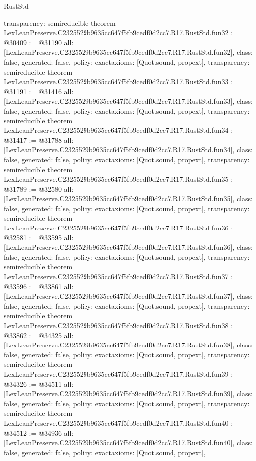 \begin{lexlean}{RustStd}
\begin{coremodule}
{  transparency: semireducible
}
theorem LexLeanPreserve.C2325529b9635cc647f5fb9cedf0d2cc7.R17.RustStd.fun32 : @30409 := @31190 {
  all: [LexLeanPreserve.C2325529b9635cc647f5fb9cedf0d2cc7.R17.RustStd.fun32],
  class: false,
  generated: false,
  policy: exact{axioms: [Quot.sound, propext]},
  transparency: semireducible
}
theorem LexLeanPreserve.C2325529b9635cc647f5fb9cedf0d2cc7.R17.RustStd.fun33 : @31191 := @31416 {
  all: [LexLeanPreserve.C2325529b9635cc647f5fb9cedf0d2cc7.R17.RustStd.fun33],
  class: false,
  generated: false,
  policy: exact{axioms: [Quot.sound, propext]},
  transparency: semireducible
}
theorem LexLeanPreserve.C2325529b9635cc647f5fb9cedf0d2cc7.R17.RustStd.fun34 : @31417 := @31788 {
  all: [LexLeanPreserve.C2325529b9635cc647f5fb9cedf0d2cc7.R17.RustStd.fun34],
  class: false,
  generated: false,
  policy: exact{axioms: [Quot.sound, propext]},
  transparency: semireducible
}
theorem LexLeanPreserve.C2325529b9635cc647f5fb9cedf0d2cc7.R17.RustStd.fun35 : @31789 := @32580 {
  all: [LexLeanPreserve.C2325529b9635cc647f5fb9cedf0d2cc7.R17.RustStd.fun35],
  class: false,
  generated: false,
  policy: exact{axioms: [Quot.sound, propext]},
  transparency: semireducible
}
theorem LexLeanPreserve.C2325529b9635cc647f5fb9cedf0d2cc7.R17.RustStd.fun36 : @32581 := @33595 {
  all: [LexLeanPreserve.C2325529b9635cc647f5fb9cedf0d2cc7.R17.RustStd.fun36],
  class: false,
  generated: false,
  policy: exact{axioms: [Quot.sound, propext]},
  transparency: semireducible
}
theorem LexLeanPreserve.C2325529b9635cc647f5fb9cedf0d2cc7.R17.RustStd.fun37 : @33596 := @33861 {
  all: [LexLeanPreserve.C2325529b9635cc647f5fb9cedf0d2cc7.R17.RustStd.fun37],
  class: false,
  generated: false,
  policy: exact{axioms: [Quot.sound, propext]},
  transparency: semireducible
}
theorem LexLeanPreserve.C2325529b9635cc647f5fb9cedf0d2cc7.R17.RustStd.fun38 : @33862 := @34325 {
  all: [LexLeanPreserve.C2325529b9635cc647f5fb9cedf0d2cc7.R17.RustStd.fun38],
  class: false,
  generated: false,
  policy: exact{axioms: [Quot.sound, propext]},
  transparency: semireducible
}
theorem LexLeanPreserve.C2325529b9635cc647f5fb9cedf0d2cc7.R17.RustStd.fun39 : @34326 := @34511 {
  all: [LexLeanPreserve.C2325529b9635cc647f5fb9cedf0d2cc7.R17.RustStd.fun39],
  class: false,
  generated: false,
  policy: exact{axioms: [Quot.sound, propext]},
  transparency: semireducible
}
theorem LexLeanPreserve.C2325529b9635cc647f5fb9cedf0d2cc7.R17.RustStd.fun40 : @34512 := @34936 {
  all: [LexLeanPreserve.C2325529b9635cc647f5fb9cedf0d2cc7.R17.RustStd.fun40],
  class: false,
  generated: false,
  policy: exact{axioms: [Quot.sound, propext]},
}
\end{coremodule}
\end{lexlean}
